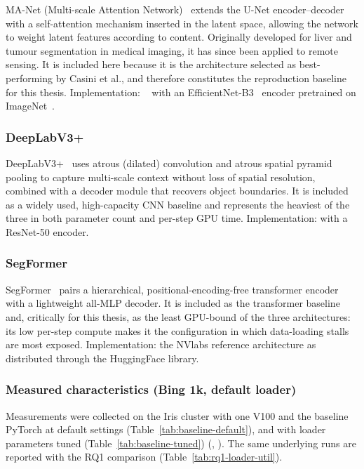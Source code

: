 MA-Net (Multi-scale Attention Network)~\cite{Fan20} extends the U-Net
encoder--decoder with a self-attention mechanism inserted in the latent space,
allowing the network to weight latent features according to content.
Originally developed for liver and tumour segmentation in medical imaging, it has
since been applied to remote sensing.
It is included here because it is the architecture selected as best-performing by
Casini et al., and therefore constitutes the reproduction baseline for this thesis.
Implementation: ~\cite{Iakubovskii19} with an
EfficientNet-B3~\cite{Tan19} encoder pretrained on ImageNet~\cite{Deng09}.

\subsubsection{DeepLabV3+}

DeepLabV3+~\cite{Chen18} uses atrous (dilated) convolution and atrous spatial
pyramid pooling to capture multi-scale context without loss of spatial resolution,
combined with a decoder module that recovers object boundaries.
It is included as a widely used, high-capacity CNN baseline and represents the
heaviest of the three in both parameter count and per-step GPU time.
Implementation:  with a ResNet-50 encoder.

\subsubsection{SegFormer}

SegFormer~\cite{Xie21} pairs a hierarchical, positional-encoding-free transformer
encoder with a lightweight all-MLP decoder.
It is included as the transformer baseline and, critically for this thesis, as the
least GPU-bound of the three architectures: its low per-step compute makes it the
configuration in which data-loading stalls are most exposed.
Implementation: the NVlabs reference architecture as distributed through the
HuggingFace  library.

\subsubsection{Measured characteristics (Bing 1k, default loader)}
\label{sec:measured-baseline}

Measurements were collected on the Iris cluster with one V100 and the baseline
PyTorch  at default settings (Table~\ref{tab:baseline-default}),
and with loader parameters tuned (Table~\ref{tab:baseline-tuned})
(, ). The same underlying runs are
reported with the RQ1 comparison (Table~\ref{tab:rq1-loader-util}).

